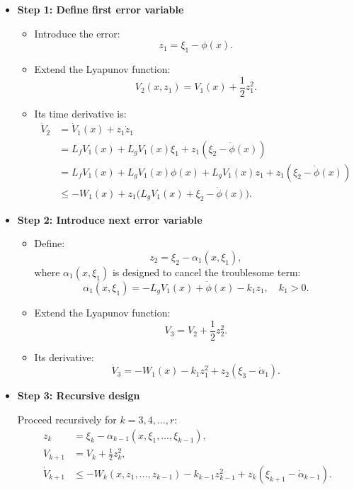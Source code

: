 \begin{itemize}
    
\item\textbf{Step 1: Define first error variable}

\begin{itemize}
    \item Introduce the error:
    \[
        z_1 = \xi_1 - \phi(x).
    \]
    \item Extend the Lyapunov function:
    \[
        V_2(x, z_1) = V_1(x) + \frac{1}{2} z_1^2.
    \]
    \item Its time derivative is:
    \begin{align*}
        \dot{V}_2 &= \dot{V}_1(x) + z_1 \dot{z}_1 \\
        &= L_f V_1(x) + L_g V_1(x)\xi_1 + z_1(\xi_2 - \dot{\phi}(x)) \\
        &= L_f V_1(x) + L_g V_1(x)\phi(x) + L_g V_1(x) z_1 + z_1(\xi_2 - \dot{\phi}(x)) \\
        &\leq -W_1(x) + z_1\big(L_g V_1(x) + \xi_2 - \dot{\phi}(x)\big).
    \end{align*}
\end{itemize}

\item\textbf{Step 2: Introduce next error variable}

\begin{itemize}
    \item Define:
    \[
        z_2 = \xi_2 - \alpha_1(x, \xi_1),
    \]
    where $\alpha_1(x,\xi_1)$ is designed to cancel the troublesome term:
    \[
        \alpha_1(x, \xi_1) = -L_g V_1(x) + \dot{\phi}(x) - k_1 z_1, \quad k_1 > 0.
    \]
    \item Extend the Lyapunov function:
    \[
        V_3 = V_2 + \frac{1}{2} z_2^2.
    \]
    \item Its derivative:
    \[
        \dot{V}_3 = -W_1(x) - k_1 z_1^2 + z_2(\xi_3 - \dot{\alpha}_1).
    \]
\end{itemize}

\item\textbf{Step 3: Recursive design}

Proceed recursively for $k=3,4,\dots,r$:
\begin{align}
    z_k &= \xi_k - \alpha_{k-1}(x,\xi_1,\dots,\xi_{k-1}), \\
    V_{k+1} &= V_k + \frac{1}{2} z_k^2, \\
    \dot{V}_{k+1} &\leq - W_k(x, z_1, \dots, z_{k-1}) - k_{k-1} z_{k-1}^2 + z_k(\xi_{k+1} - \dot{\alpha}_{k-1}).
\end{align}


\end{itemize}
